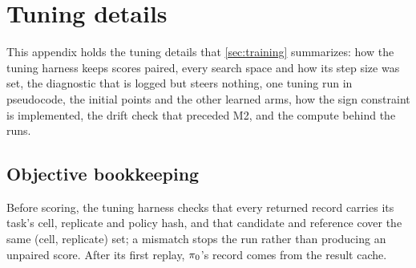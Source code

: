 %

\section{Tuning details}
\label{app:tuning}

This appendix holds the tuning details that \cref{sec:training} summarizes: how the tuning harness
keeps scores paired, every search space and how its step size was set, the diagnostic that is
logged but steers nothing, one tuning run in pseudocode, the initial points and the other learned
arms, how the sign constraint is implemented, the drift check that preceded M2, and the compute
behind the runs.

\subsection{Objective bookkeeping}

Before scoring, the tuning harness checks that every returned record carries its task's cell,
replicate and policy hash, and that candidate and reference cover the same (cell, replicate) set;
a mismatch stops the run rather than producing an unpaired score. After its first replay,
$\pi_{0}$'s record comes from the result cache.


